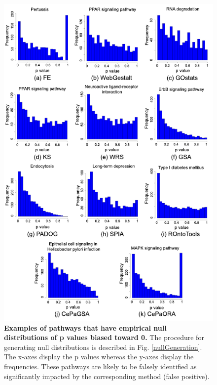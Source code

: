 \begin{figure}
\centering

	\includegraphics[width=0.8\linewidth]{../Figures/Biased0}
	\caption{\textbf{Examples of pathways that have empirical null distributions of p values biased toward 0.} The procedure for generating null distributions is described in Fig. \ref{nullGeneration}. The x-axes display the p values whereas the y-axes display the frequencies. These pathways are likely to be falsely identified as significantly impacted by the corresponding method (false positive).}\label{fig:Biased0}
\end{figure}

